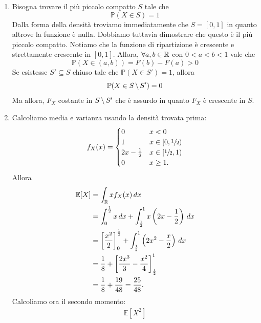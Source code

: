 \documentclass[a4paper]{article}
\begin{document}
\begin{snippetsolution}{}
\begin{enumerate}
\[\begin{cases}
                    0 & x \geq 1
                \end{cases}
            \]
        \item Bisogna trovare il più piccolo compatto \(S\) tale che \[
                \mathbb P(X \in S) = 1
            \]
            Dalla forma della densità troviamo immediatamente che \(S = [0,1]\)
            in quanto altrove la funzione è nulla. Dobbiamo tuttavia dimostrare che questo è il più piccolo compatto.
            Notiamo che la funzione di ripartizione è crescente e strettamente crescente in \([0,1]\).
            Allora, \(\forall a,b \in \mathbb{R}\) con \(0 < a < b < 1\) vale che \[
                \mathbb P(X \in (a,b)) = F(b) - F(a) > 0
            \]
            Se esistesse \(S' \subseteq S\) chiuso tale che
            \(\mathbb P(X \in S') = 1\), allora
            \[
                \mathbb P(X \in S \,\backslash\, S') = 0
            \]
            Ma allora, \(F_X\) costante in \(S \,\backslash\, S'\)
            che è assurdo in quanto \(F_X\) è crescente in \(S\).
        \item Calcoliamo media e varianza usando la densità trovata prima:
            \[
                f_X(x) =
                \begin{cases}
                    0 & x < 0 \\
                    1 & x \in [0,\sfrac12) \\
                    2x - \frac12 & x \in [\sfrac12, 1) \\
                    0 & x \geq 1.
                \end{cases}
            \]
            Allora
            \begin{align*}
                \mathbb E[X]
                &= \int_{\mathbb{R}} x f_X(x) \, dx \\
                &= \int_0^{\frac12} x \, dx
                + \int_{\frac12}^1 x\left(2x-\frac12\right) \, dx \\
                &= \left[\frac{x^2}{2}\right]_0^{\frac12}
                + \int_{\frac12}^1 \left(2x^2-\frac{x}{2}\right) \, dx \\
                &= \frac18
                + \left[\frac{2x^3}{3} - \frac{x^2}{4}\right]_{\frac12}^1 \\
                &= \frac18 + \frac{19}{48}
                = \frac{25}{48}.
            \end{align*}
            Calcoliamo ora il secondo momento:
            \begin{align*}
                \mathbb E[X^2]

\end{align*}
\end{enumerate}
\end{snippetsolution}
\end{document}
